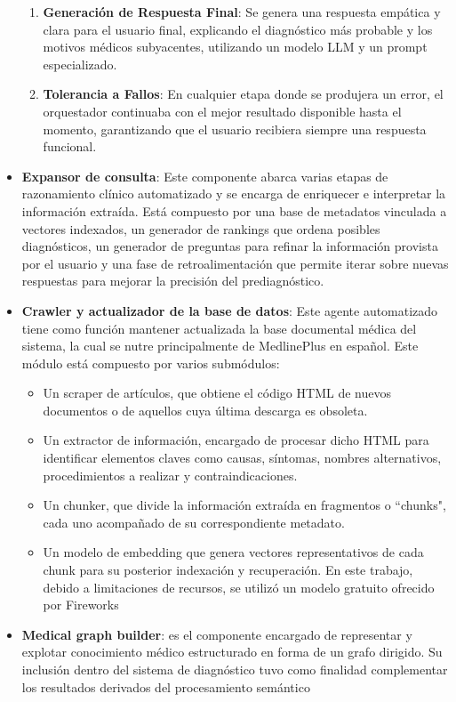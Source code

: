 \documentclass{llncs}
\begin{document}
\begin{itemize}
\begin{enumerate}
    \item \textbf{Generación de Respuesta Final}: Se genera una respuesta empática y clara para el usuario final, explicando el diagnóstico más probable y los motivos médicos subyacentes, utilizando un modelo LLM y un prompt especializado.
    \item \textbf{Tolerancia a Fallos}: En cualquier etapa donde se produjera un error, el orquestador continuaba con el mejor resultado disponible hasta el momento, garantizando que el usuario recibiera siempre una respuesta funcional.
  \end{enumerate}
  \item \textbf{Expansor de consulta}: Este componente abarca varias etapas de razonamiento clínico automatizado y se encarga de enriquecer e interpretar la información extraída. Está compuesto por una base de metadatos vinculada a vectores indexados, un
  generador de rankings que ordena posibles diagnósticos, un generador de preguntas para refinar la información provista por el usuario y una fase de retroalimentación que permite iterar sobre nuevas respuestas para mejorar la precisión del prediagnóstico.
  \item \textbf{Crawler y actualizador de la base de datos}: Este agente automatizado tiene como función mantener actualizada la base documental médica del sistema, la cual se nutre principalmente de MedlinePlus\cite{medlineplus} en español. Este módulo está compuesto
  por varios submódulos:
  \begin{itemize}
    \item Un scraper de artículos, que obtiene el código HTML de nuevos documentos o de aquellos cuya última descarga es obsoleta.
    \item Un extractor de información, encargado de procesar dicho HTML para identificar elementos claves como causas, síntomas, nombres alternativos, procedimientos a realizar y contraindicaciones.
    \item Un chunker, que divide la información extraída en fragmentos o ``chunks", cada uno acompañado de su correspondiente metadato.
    \item Un modelo de embedding que genera vectores representativos de cada chunk para su posterior indexación y recuperación. En este trabajo, debido a limitaciones de recursos, se utilizó un modelo gratuito ofrecido por Fireworks\cite{fireworks_ai}
  \end{itemize}
  \item \textbf{Medical graph builder}: es el componente encargado de representar y explotar conocimiento médico estructurado en forma de un grafo dirigido. Su inclusión dentro del sistema de diagnóstico tuvo como finalidad complementar los resultados derivados del procesamiento semántico 

\end{itemize}
\end{document}
